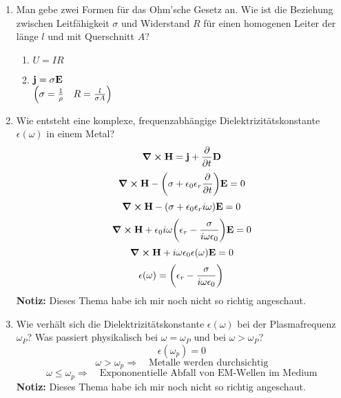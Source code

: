 \documentclass{scrartcl}
\begin{document}
\begin{enumerate}
    \item Man gebe zwei Formen für das Ohm'sche Gesetz an. Wie ist die
          Beziehung zwischen Leitfähigkeit $\sigma$ und Widerstand $R$ 
          für einen homogenen Leiter der länge $l$ und mit 
          Querschnitt $A$?
          \begin{enumerate}
            \item $U=IR$
            \item $\vb j= \sigma \vb E$\\
              $\qty(\sigma=\frac{1}{\rho}\quad R=\frac{l}{\sigma A})$
          \end{enumerate}

    \item Wie entsteht eine komplexe, frequenzabhängige 
          Dielektrizitätskonstante $\epsilon(\omega)$ in einem Metal?
          $$\curl \vb H = \vb j + \pdv{t}\vb D$$
          $$\curl \vb H -\qty(\sigma +\epsilon_0\epsilon_r\pdv{t})\vb E=0$$
          $$\curl \vb H -\qty(\sigma +\epsilon_0\epsilon_ri\omega)\vb E=0$$
          $$\curl \vb H +\epsilon_0 i\omega
          \qty(\epsilon_r-\frac{\sigma}{i\omega\epsilon_0})\vb E=0$$
          $$\curl \vb H +i\omega\epsilon_0 \epsilon(\omega)\vb E=0$$
          $$\epsilon(\omega)=\qty(\epsilon_r-\frac{\sigma}
          {i\omega\epsilon_0})$$
          \textbf{Notiz:} Dieses Thema habe ich mir noch nicht so richtig
          angeschaut.

    \item Wie verhält sich die Dielektrizitätskonstante $\epsilon(\omega)$
          bei der Plasmafrequenz $\omega_P$? Was passiert physikalisch bei
          $\omega=\omega_P$ und bei $\omega>\omega_P$?
          $$\epsilon(\omega_p)=0$$
          $$\omega>\omega_p \Rightarrow\quad
          \text{Metalle werden durchsichtig}$$
          $$\omega\le\omega_p \Rightarrow\quad
          \text{Expononentielle Abfall von EM-Wellen im Medium}$$
          \textbf{Notiz:} Dieses Thema habe ich mir noch nicht so richtig
          angeschaut.

  \end{enumerate}
\end{document}
